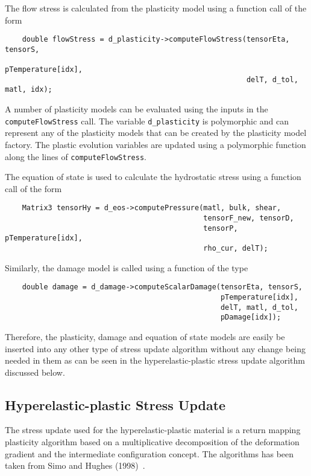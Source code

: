 The flow stress is calculated from the plasticity model using a 
function call of the form
\begin{verbatim}
    double flowStress = d_plasticity->computeFlowStress(tensorEta, tensorS, 
                                                        pTemperature[idx],
                                                        delT, d_tol, matl, idx);
\end{verbatim}
A number of plasticity models can be evaluated using the inputs in the
\verb+computeFlowStress+ call.  The variable \verb+d_plasticity+ is
polymorphic and can represent any of the plasticity models that can be
created by the plasticity model factory.  The plastic evolution variables
are updated using a polymorphic function along the lines of
\verb+computeFlowStress+.

The equation of state is used to calculate the hydrostatic stress using
a function call of the form
\begin{verbatim}
    Matrix3 tensorHy = d_eos->computePressure(matl, bulk, shear, 
                                              tensorF_new, tensorD, 
                                              tensorP, pTemperature[idx], 
                                              rho_cur, delT);
\end{verbatim}

Similarly, the damage model is called using a function of the type
\begin{verbatim}
    double damage = d_damage->computeScalarDamage(tensorEta, tensorS, 
                                                  pTemperature[idx],
                                                  delT, matl, d_tol, 
                                                  pDamage[idx]);
\end{verbatim}

Therefore, the plasticity, damage and equation of state models are 
easily be inserted into any other type of stress update algorithm 
without any change being needed in them as can be seen in the 
hyperelastic-plastic stress update algorithm discussed below.

\subsection{Hyperelastic-plastic Stress Update}
The stress update used for the hyperelastic-plastic material is
a return mapping plasticity algorithm based on a multiplicative 
decomposition of the deformation gradient and the intermediate
configuration concept.  The algorithms has been taken from
Simo and Hughes (1998)~\cite{Simo1998}.

